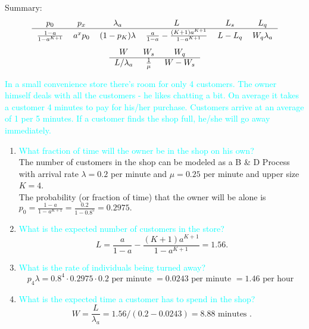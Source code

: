 \documentclass[20pt,landscape]{foils}
\newcommand{\no}{\noindent}
\begin{document}
\foilhead[-.8in]{\textcolor{blue}{The $M/M/1/K$ queue (cont'd)}}\vspace*{.2in}

Summary:
\[\begin{tabular}{cccccc}
 $p_0$ & $p_x$ &
 $\lambda_a$ & $L$ & $L_s$ & $L_q$ \\\hline
 $\frac{1-a}{1-a^{K+1}}$
 & $a^xp_0$
 & $(1-p_K)\lambda$
 & $\frac{a}{1-a} - \frac{(K+1)a^{K+1}}{1-a^{K+1}}$
 & $L-L_q$
 & $W_q \lambda_a$
\end{tabular}\]
\[\begin{tabular}{ccc}
  $W$ & $W_s$  & $W_q$\\\hline
$L/\lambda_a$
& $\frac{1}{\mu}$
& $ W-W_s$
\end{tabular}\]

\foilhead[-.8in]{\textcolor{blue}{Example}}\vspace*{.2in}
\no  {\textcolor{magenta}{Convenience Store:}} {\textcolor{cyan}{In a small convenience store there's room for only 4 customers. The owner himself deals with all the customers - he likes chatting a bit. On average it takes a customer 4 minutes to  pay for his/her purchase.
Customers arrive at an average of 1 per 5 minutes. If a customer finds the shop full, he/she will go away immediately.}}
\begin{enumerate}
\item {\textcolor{cyan}{What fraction of time will the owner be in the shop on his own?}}\\[.1in]
\no The number of customers in the shop can be modeled as a B \& D Process with arrival rate $\lambda = 0.2$ per minute and $\mu = 0.25$ per minute and upper size $K = 4$.\\[.1in]
\no The probability (or fraction of time) that the owner will be alone is $p_0 = \frac{1-a}{1-a^{K+1}} = \frac{0.2}{1-0.8^5} = 0.2975.$\\[.1in]
\foilhead[-.8in]{\textcolor{blue}{Example (cont'd)}}\vspace*{.2in}
\item {\textcolor{cyan}{What is the expected number of customers in the store?}}
\[
L = \frac{a}{1-a} - \frac{(K+1) a^{K+1}}{1 - a^{K+1}} = 1.56.
\]
\item {\textcolor{cyan}{What is the rate of individuals being turned away?}}\\[.1in]
\[
p_4 \lambda = 0.8^4 \cdot 0.2975 \cdot 0.2 \text{ per minute } = 0.0243 \text{ per minute } = 1.46 \text{ per hour }
\]
\item {\textcolor{cyan}{What is the expected time a customer has to spend in the shop?}}\\[.1in]
\[
W = \frac{L}{\lambda_a} = 1.56/(0.2 - 0.0243) = 8.88 \text{ minutes }.
\]
\end{enumerate}
\end{document}
